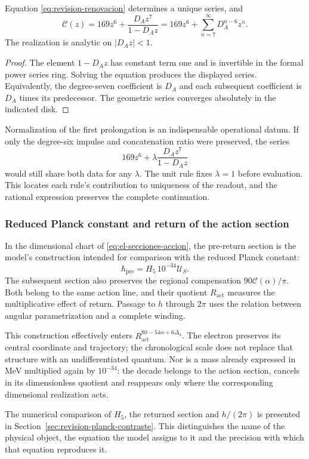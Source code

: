 \begin{proposition}
Equation \eqref{eq:revision-renovacion} determines a unique series, and
\[
 \mathscr C(z)=169z^6+\frac{D_Az^7}{1-D_Az}
             =169z^6+\sum_{n=7}^{\infty}D_A^{n-6}z^n.
\]
The realization is analytic on \(|D_Az|<1\).
\end{proposition}
\begin{proof}
The element \(1-D_Az\) has constant term one and is invertible
in the formal power series ring. Solving the equation produces the displayed
series. Equivalently, the degree-seven coefficient is \(D_A\)
and each subsequent coefficient is \(D_A\) times its predecessor. The
geometric series converges absolutely in the indicated disk.
\end{proof}

Normalization of the first prolongation is an indispensable operational
datum. If only the degree-six impulse and
concatenation ratio were preserved, the series
\[
 169z^6+\lambda\frac{D_Az^7}{1-D_Az}
\]
would still share both data for any \(\lambda\).
The unit rule fixes \(\lambda=1\) before evaluation.
This locates each rule's contribution to uniqueness of the
readout, and the rational expression preserves the complete continuation.

\subsubsection{Reduced Planck constant and return of the action section}

In the dimensional chart of \eqref{eq:el-secciones-accion}, the
pre-return section is the model's construction intended for comparison
with the reduced Planck constant:
\[
 \hbar_{\mathrm{pre}}=H_5\,10^{-34}\mathcal U_S.
\]
The subsequent section also preserves the regional compensation
\(90\mathscr C(\alpha)/\pi\). Both belong to the same action
line, and their quotient \(R_{\mathrm{act}}\) measures the multiplicative
effect of return. Passage to \(h\) through \(2\pi\) uses the relation
between angular parametrization and a complete winding.

This construction effectively enters
\(R_{\mathrm{act}}^{80-54\alpha+6\Delta_4}\). The electron preserves
its central coordinate and trajectory; the chronological scale does not
replace that structure with an undifferentiated quantum. Nor is a mass
already expressed in MeV multiplied again by \(10^{-34}\):
the decade belongs to the action section, cancels in its dimensionless
quotient and reappears only where the corresponding dimensional
realization acts.

The numerical comparison of \(H_5\), the returned section and
\(h/(2\pi)\) is presented in Section~\ref{sec:revision-planck-contraste}.
This distinguishes the name of the physical object, the equation the
model assigns to it and the precision with which that equation reproduces it.
